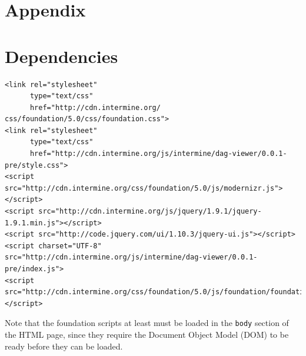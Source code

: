 \documentclass[10pt,a4paper,twocolumn]{article}
\begin{document}
\nocite{*}
{\small
}

\clearpage
\section*{Appendix}
\appendix

\section{Dependencies}
\label{sec:deps}

\lstset{language=HTML}
\begin{lstlisting}
<link rel="stylesheet"
      type="text/css"
      href="http://cdn.intermine.org/
css/foundation/5.0/css/foundation.css">
<link rel="stylesheet"
      type="text/css"
      href="http://cdn.intermine.org/js/intermine/dag-viewer/0.0.1-pre/style.css">
<script src="http://cdn.intermine.org/css/foundation/5.0/js/modernizr.js"></script>
<script src="http://cdn.intermine.org/js/jquery/1.9.1/jquery-1.9.1.min.js"></script>
<script src="http://code.jquery.com/ui/1.10.3/jquery-ui.js"></script>
<script charset="UTF-8" src="http://cdn.intermine.org/js/intermine/dag-viewer/0.0.1-pre/index.js">
<script src="http://cdn.intermine.org/css/foundation/5.0/js/foundation/foundation.js"></script>
\end{lstlisting}

Note that the foundation scripts at least must be loaded in the
\texttt{body} section of the HTML page, since they require the
Document Object Model (DOM) to be ready before they can be loaded.






\end{document}
